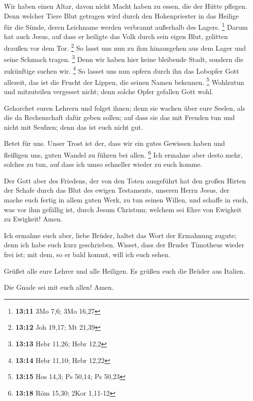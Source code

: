  Wir haben einen Altar, davon nicht Macht haben zu essen,
die der Hütte pflegen.  Denn welcher Tiere Blut getragen
wird durch den Hohenpriester in das Heilige für die Sünde, deren
Leichname werden verbrannt außerhalb des Lagers. \footnote{\textbf{13:11}
  3Mo 7,6; 3Mo 16,27}  Darum hat auch Jesus, auf dass er
heiligte das Volk durch sein eigen Blut, gelitten draußen vor dem Tor.
\footnote{\textbf{13:12} Joh 19,17; Mt 21,39}  So lasst uns
nun zu ihm hinausgehen aus dem Lager und seine Schmach tragen.
\footnote{\textbf{13:13} Hebr 11,26; Hebr 12,2}  Denn wir
haben hier keine bleibende Stadt, sondern die zukünftige suchen wir.
\footnote{\textbf{13:14} Hebr 11,10; Hebr 12,22}  So lasset
uns nun opfern durch ihn das Lobopfer Gott allezeit, das ist die Frucht
der Lippen, die seinen Namen bekennen. \footnote{\textbf{13:15} Hos
  14,3; Ps 50,14; Ps 50,23}  Wohlzutun und mitzuteilen
vergesset nicht; denn solche Opfer gefallen Gott wohl.

 Gehorchet euren Lehrern und folget ihnen; denn sie wachen
über eure Seelen, als die da Rechenschaft dafür geben sollen; auf dass
sie das mit Freuden tun und nicht mit Seufzen; denn das ist euch nicht
gut.

 Betet für uns. Unser Trost ist der, dass wir ein gutes
Gewissen haben und fleißigen uns, guten Wandel zu führen bei allen.
\footnote{\textbf{13:18} Röm 15,30; 2Kor 1,11-12}  Ich
ermahne aber desto mehr, solches zu tun, auf dass ich umso schneller
wieder zu euch komme.

 Der Gott aber des Friedens, der von den Toten ausgeführt
hat den großen Hirten der Schafe durch das Blut des ewigen Testaments,
unseren Herrn Jesus,  der mache euch fertig in allem guten
Werk, zu tun seinen Willen, und schaffe in euch, was vor ihm gefällig
ist, durch Jesum Christum; welchem sei Ehre von Ewigkeit zu Ewigkeit!
Amen.

 Ich ermahne euch aber, liebe Brüder, haltet das Wort der
Ermahnung zugute; denn ich habe euch kurz geschrieben. 
Wisset, dass der Bruder Timotheus wieder frei ist; mit dem, so er bald
kommt, will ich euch sehen.

 Grüßet alle eure Lehrer und alle Heiligen. Es grüßen euch
die Brüder aus Italien.

 Die Gnade sei mit euch allen! Amen.
